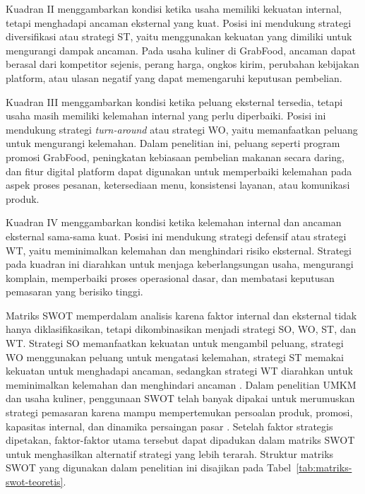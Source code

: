 Kuadran II menggambarkan kondisi ketika usaha memiliki kekuatan internal, tetapi menghadapi ancaman eksternal yang kuat. Posisi ini mendukung strategi diversifikasi atau strategi ST, yaitu menggunakan kekuatan yang dimiliki untuk mengurangi dampak ancaman. Pada usaha kuliner di GrabFood, ancaman dapat berasal dari kompetitor sejenis, perang harga, ongkos kirim, perubahan kebijakan platform, atau ulasan negatif yang dapat memengaruhi keputusan pembelian.

Kuadran III menggambarkan kondisi ketika peluang eksternal tersedia, tetapi usaha masih memiliki kelemahan internal yang perlu diperbaiki. Posisi ini mendukung strategi \textit{turn-around} atau strategi WO, yaitu memanfaatkan peluang untuk mengurangi kelemahan. Dalam penelitian ini, peluang seperti program promosi GrabFood, peningkatan kebiasaan pembelian makanan secara daring, dan fitur digital platform dapat digunakan untuk memperbaiki kelemahan pada aspek proses pesanan, ketersediaan menu, konsistensi layanan, atau komunikasi produk.

Kuadran IV menggambarkan kondisi ketika kelemahan internal dan ancaman eksternal sama-sama kuat. Posisi ini mendukung strategi defensif atau strategi WT, yaitu meminimalkan kelemahan dan menghindari risiko eksternal. Strategi pada kuadran ini diarahkan untuk menjaga keberlangsungan usaha, mengurangi komplain, memperbaiki proses operasional dasar, dan membatasi keputusan pemasaran yang berisiko tinggi.

Matriks SWOT memperdalam analisis karena faktor internal dan eksternal tidak hanya diklasifikasikan, tetapi dikombinasikan menjadi strategi SO, WO, ST, dan WT. Strategi SO memanfaatkan kekuatan untuk mengambil peluang, strategi WO menggunakan peluang untuk mengatasi kelemahan, strategi ST memakai kekuatan untuk menghadapi ancaman, sedangkan strategi WT diarahkan untuk meminimalkan kelemahan dan menghindari ancaman \parencite{david2023strategicmanagement,gurel2017swot,rangkuti2016analisisSWOT}. Dalam penelitian UMKM dan usaha kuliner, penggunaan SWOT telah banyak dipakai untuk merumuskan strategi pemasaran karena mampu mempertemukan persoalan produk, promosi, kapasitas internal, dan dinamika persaingan pasar \parencite{haliza2023seqapla,ruhiyat2023minatbeli,ramadhanti2023rucika}. Setelah faktor strategis dipetakan, faktor-faktor utama tersebut dapat dipadukan dalam matriks SWOT untuk menghasilkan alternatif strategi yang lebih terarah. Struktur matriks SWOT yang digunakan dalam penelitian ini disajikan pada Tabel~\ref{tab:matriks-swot-teoretis}.

